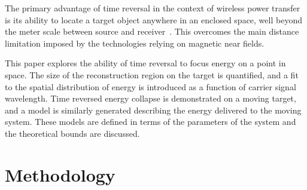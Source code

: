 \documentclass[conference]{IEEEtran}
\begin{document}
The primary advantage of time reversal in the context of wireless power transfer
is its ability to locate a target object anywhere in an enclosed space, well
beyond the meter scale between source and
receiver~\cite{fink,nltr-wave-chaotic}.
%
This overcomes the main distance limitation imposed by the technologies relying
on magnetic near fields.



This paper explores the ability of time reversal to focus energy on a point in
space.
%
The size of the reconstruction region on the target is quantified, and a fit to
the spatial distribution of energy is introduced as a function of carrier signal
wavelength.
%
Time reversed energy collapse is demonstrated on a moving target, and a model is
similarly generated describing the energy delivered to the moving system.
%
These models are defined in terms of the parameters of the system and the
theoretical bounds are discussed.


\section{Methodology}
\label{sec:methodology}
\end{document}
